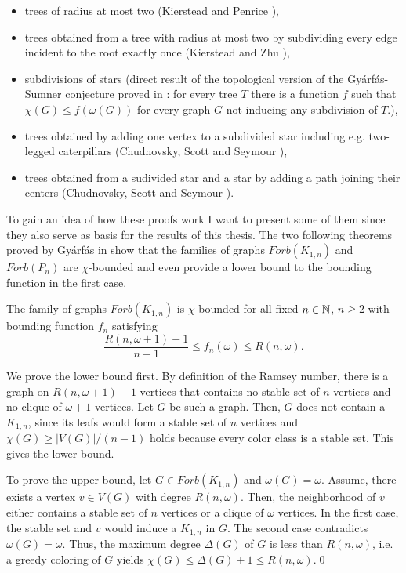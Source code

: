 \begin{itemize}
\item trees of radius at most two (Kierstead and Penrice \cite{Ki94}),
\item trees obtained from a tree with radius at most two by subdividing every edge incident to the root exactly once (Kierstead and Zhu \cite{Ki04}),
\item subdivisions of stars (direct result of the topological version of the Gyárfás-Sumner conjecture proved in \cite{Sc97}: for every tree $T$ there is a function $f$ such that $\chi (G)\leq f(\omega (G))$ for every graph $G$ not inducing any subdivision of $T$.),
\item trees obtained by adding one vertex to a subdivided star including e.g. two-legged caterpillars (Chudnovsky, Scott and Seymour \cite{CSP17}),
\item trees obtained from a sudivided star and a star by adding a path joining their centers (Chudnovsky, Scott and Seymour \cite{CSP17}).
\end{itemize} 

To gain an idea of how these proofs work I want to present some of them since they also serve as basis for the results of this thesis. The two following theorems proved by Gyárfás in \cite{Gy87} show that the families of graphs $\textit{Forb}(K_{1,n})$ and $\textit{Forb}(P_n)$ are $\chi$-bounded and even provide a lower bound to the bounding function in the first case.

\begin{thm} The family of graphs $\textit{Forb}(K_{1,n})$ is $\chi$-bounded for all fixed $n \in\mathbb{N}$, $n\geq 2$ with bounding function $f_n$ satisfying \[\dfrac{R(n,\omega + 1) - 1}{n-1}\leq f_n(\omega )\leq R(n,\omega ).\] 
\end{thm}
\begin{prf}
We prove the lower bound first. By definition of the Ramsey number, there is a graph on $R(n,\omega + 1) - 1$ vertices that contains no stable set of $n$ vertices and no clique of $\omega + 1$ vertices. Let $G$ be such a graph. Then, $G$ does not contain a $K_{1,n}$, since its leafs would form a stable set of $n$ vertices and $\chi (G)\geq |V(G)| /(n-1)$ holds because every color class is a stable set. This gives the lower bound.

To prove the upper bound, let $G \in\textit{Forb} (K_{1,n})$ and $\omega (G) = \omega$. Assume, there exists a vertex $v\in V(G)$ with degree $R(n,\omega)$. Then, the neighborhood of $v$ either contains a stable set of $n$ vertices or a clique of $\omega$ vertices. In the first case, the stable set and $v$ would induce a $K_{1,n}$ in $G$. The second case contradicts $\omega (G) = \omega$. Thus, the maximum degree $\Delta (G)$ of $G$ is less than $R(n,\omega)$, i.e. a greedy coloring of $G$ yields $\chi (G)\leq\Delta (G) + 1\leq R(n,\omega)$.\qed
\end{prf}

